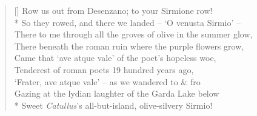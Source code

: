 \documentclass[MAIN]{subfiles}
\begin{document}
\begin{verse}[\versewidth]
Row us out from {\sc Desenzano}; to your {\sc Sirmione} row!\\*
So they rowed, and there we landed -- `{\hge O venusta} {\sc Sirmio}' --\\
There to me through all the groves of olive in the summer glow,\\
There beneath the roman ruin where the purple flowers grow,\\
Came that `{\hge ave atque vale}' of the poet's hopeless woe,\\
Tenderest of roman poets 19 hundred years ago,\\
`{\hge Frater, ave atque vale}' -- as we wandered to \& fro\\
Gazing at the lydian laughter of the {\sc Garda Lake} below\\*
Sweet \emph{Catullus}'s all-but-island, olive-silvery {\sc Sirmio}!
\end{verse}
\end{document}
